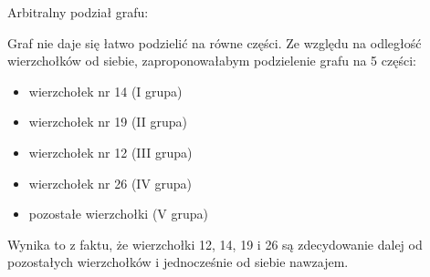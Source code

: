 \documentclass{article}
\begin{document}
    Arbitralny podział grafu:


Graf nie daje się łatwo podzielić na równe części. Ze względu na
odległość wierzchołków od siebie, zaproponowałabym podzielenie grafu na
5 części: 
\begin{itemize}
	\item wierzchołek nr 14 (I grupa) 
	\item wierzchołek nr 19 (II grupa) 
	\item wierzchołek nr 12 (III grupa) 
	\item wierzchołek nr 26 (IV grupa) 
	\item pozostałe wierzchołki (V grupa)
\end{itemize}
Wynika to z faktu, że wierzchołki 12, 14, 19 i 26 są zdecydowanie dalej
od pozostałych wierzchołków i jednocześnie od siebie nawzajem.

    
    
    
    
\end{document}
